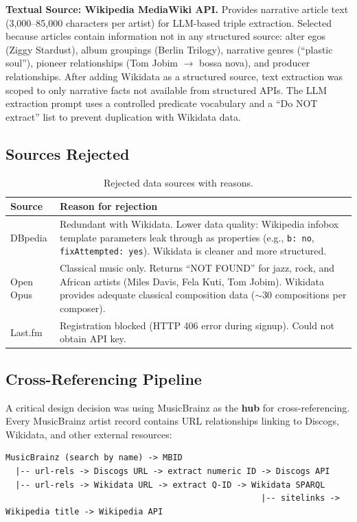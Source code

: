 \documentclass[11pt,a4paper]{article}
\begin{document}
\textbf{Textual Source: Wikipedia MediaWiki API.} Provides narrative article text (3,000--85,000 characters per artist) for LLM-based triple extraction. Selected because articles contain information not in any structured source: alter egos (Ziggy Stardust), album groupings (Berlin Trilogy), narrative genres (``plastic soul''), pioneer relationships (Tom Jobim $\rightarrow$ bossa nova), and producer relationships. After adding Wikidata as a structured source, text extraction was scoped to only narrative facts not available from structured APIs. The LLM extraction prompt uses a controlled predicate vocabulary and a ``Do NOT extract'' list to prevent duplication with Wikidata data.

\subsection{Sources Rejected}

\begin{table}[h]
\centering
\small
\begin{tabular}{lp{10cm}}
\toprule
\textbf{Source} & \textbf{Reason for rejection} \\
\midrule
DBpedia & Redundant with Wikidata. Lower data quality: Wikipedia infobox template parameters leak through as properties (e.g., \texttt{b: no}, \texttt{fixAttempted: yes}). Wikidata is cleaner and more structured. \\
Open Opus & Classical music only. Returns ``NOT FOUND'' for jazz, rock, and African artists (Miles Davis, Fela Kuti, Tom Jobim). Wikidata provides adequate classical composition data ($\sim$30 compositions per composer). \\
Last.fm & Registration blocked (HTTP 406 error during signup). Could not obtain API key. \\
\bottomrule
\end{tabular}
\caption{Rejected data sources with reasons.}
\end{table}

\subsection{Cross-Referencing Pipeline}

A critical design decision was using MusicBrainz as the \textbf{hub} for cross-referencing. Every MusicBrainz artist record contains URL relationships linking to Discogs, Wikidata, and other external resources:

\begin{lstlisting}
MusicBrainz (search by name) -> MBID
  |-- url-rels -> Discogs URL -> extract numeric ID -> Discogs API
  |-- url-rels -> Wikidata URL -> extract Q-ID -> Wikidata SPARQL
                                                    |-- sitelinks -> Wikipedia title -> Wikipedia API
\end{lstlisting}
\end{document}
